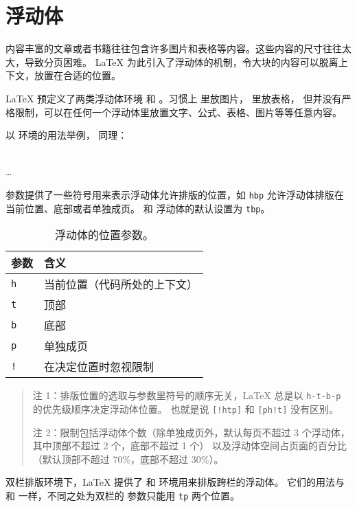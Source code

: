 \section{浮动体}\label{sec:float}

内容丰富的文章或者书籍往往包含许多图片和表格等内容。这些内容的尺寸往往太大，导致分页困难。
\LaTeX{} 为此引入了浮动体的机制，令大块的内容可以脱离上下文，放置在合适的位置。

\LaTeX{} 预定义了两类浮动体环境  和 。习惯上  里放图片， 里放表格，
但并没有严格限制，可以在任何一个浮动体里放置文字、公式、表格、图片等等任意内容。

以  环境的用法举例， 同理：
\begin{command}
 \\
\ldots \\
\end{command}

 参数提供了一些符号用来表示浮动体允许排版的位置，如 \texttt{hbp} 允许浮动体排版在当前位置、底部或者单独成页。
 和  浮动体的默认设置为 \texttt{tbp}。
\begin{table}[htp]
\centering
\caption{浮动体的位置参数。}\label{tbl:float-placement}
\begin{tabular}{*{2}{l}}
 \hline
 \textbf{参数} & \textbf{含义} \\
 \hline
 \texttt{h} & 当前位置（代码所处的上下文） \\
 \texttt{t} & 顶部 \\
 \texttt{b} & 底部 \\
 \texttt{p} & 单独成页 \\
 \texttt{!} & 在决定位置时忽视限制 \\
 \hline
\end{tabular}
\begin{quote}\footnotesize
注 1：排版位置的选取与参数里符号的顺序无关，\LaTeX{} 总是以 \texttt{h-t-b-p} 的优先级顺序决定浮动体位置。
也就是说 \texttt{[!htp]} 和 \texttt{[ph!t]} 没有区别。\par
注 2：限制包括浮动体个数（除单独成页外，默认每页不超过 3 个浮动体，其中顶部不超过 2 个，底部不超过 1 个）
以及浮动体空间占页面的百分比（默认顶部不超过 70\%，底部不超过 30\%）。
\end{quote}
\end{table}

双栏排版环境下，\LaTeX{} 提供了  和  环境用来排版跨栏的浮动体。
它们的用法与  和  一样，不同之处为双栏的  参数只能用 \texttt{tp} 两个位置。

